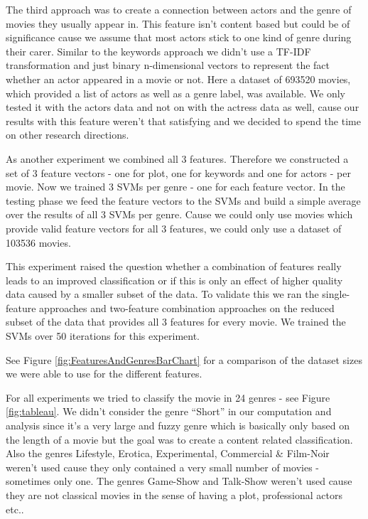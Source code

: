 \documentclass{vldb}
\begin{document}
\par The third approach was to create a connection between actors and the genre of movies they usually appear in. This feature isn't content based but could be of significance cause we assume that most actors stick to one kind of genre during their carer. Similar to the keywords approach we didn't use a TF-IDF transformation and just binary n-dimensional vectors to represent the fact whether an actor appeared in a movie or not. Here a dataset of 693520 movies, which provided a list of actors as well as a genre label, was available. We only tested it with the actors data and not on with the actress data as well, cause our results with this feature weren't that satisfying and we decided to spend the time on other research directions.

\par As another experiment we combined all 3 features. Therefore we constructed a set of 3 feature vectors - one for plot, one for keywords and one for actors - per movie. Now we trained 3 SVMs per genre - one for each feature vector. In the testing phase we feed the feature vectors to the SVMs and build a simple average over the results of all 3 SVMs per genre. Cause we could only use movies which provide valid feature vectors for all 3 features, we could only use a dataset of 103536 movies.

\par This experiment raised the question whether a combination of features really leads to an improved classification or if this is only an effect of higher quality data caused by a smaller subset of the data. To validate this we ran the single-feature approaches and two-feature combination approaches on the reduced subset of the data that provides all 3 features for every movie. We trained the SVMs over 50 iterations for this experiment.

\par See Figure \ref{fig:FeaturesAndGenresBarChart} for a comparison of the dataset sizes we were able to use for the different features.

\par For all experiments we tried to classify the movie in 24 genres - see Figure \ref{fig:tableau}. We didn't consider the genre “Short” in our computation and analysis since it's a very large and fuzzy genre which is basically only based on the length of a movie but the goal was to create a content related classification. Also the genres Lifestyle, Erotica, Experimental, Commercial \& Film-Noir weren't used cause they only contained a very small number of movies - sometimes only one. The genres Game-Show and Talk-Show weren't used cause they are not classical movies in the sense of having a plot, professional actors etc..
\end{document}

